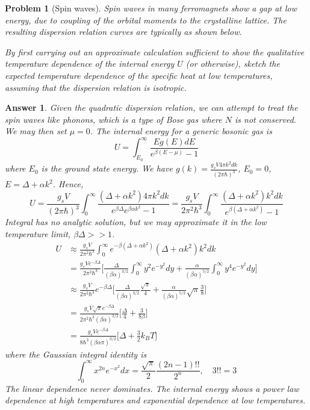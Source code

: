 \documentclass[a4paper]{article}
\theoremstyle{new2}
\newtheorem{ans}{Answer}[section]
\theoremstyle{new}
\newtheorem{qns}{Problem}[section]
\begin{document}
\begin{qns}[Spin waves]
Spin waves in many ferromagnets show a gap at low energy, due to coupling of the orbital moments to the crystalline lattice. The resulting dispersion relation curves are typically as shown below.
\begin{center}
\end{center}
By first carrying out an approximate calculation sufficient to show the qualitative temperature dependence of the internal energy $U$ (or otherwise), sketch the expected temperature dependence of the specific heat at low temperatures, assuming that the dispersion relation is isotropic.
\end{qns}
\begin{ans}
Given the quadratic dispersion relation, we can attempt to treat the spin waves like phonons, which is a type of Bose gas where $N$ is not conserved. We may then set $\mu=0$. The internal energy for a generic bosonic gas is
$$U=\int_{E_0}^\infty\frac{Eg(E)dE}{e^{\beta(E-\mu)}-1}$$
where $E_0$ is the ground state energy. We have $g(k)=\frac{g_sV4\pi k^2dk}{(2\pi\hbar)^3}$, $E_0=0$, $E=\Delta+\alpha k^2$. Hence,
$$U=\frac{g_sV}{(2\pi\hbar)^3}\int_0^\infty\frac{(\Delta+\alpha k^2)4\pi k^2dk}{e^{\beta\Delta}e^{\beta\alpha k^2}-1}=\frac{g_sV}{2\pi^2\hbar^3}\int_0^\infty\frac{(\Delta+\alpha k^2)k^2dk}{e^{\beta(\Delta+\alpha k^2)}-1}$$
Integral has no analytic solution, but we may approximate it in the low temperature limit, $\beta\Delta >>1$. 
\begin{align}
    U&\approx\frac{g_sV}{2\pi^2\hbar^3}\int_0^\infty e^{-\beta(\Delta+\alpha k^2)}(\Delta+\alpha k^2)k^2dk\nonumber\\&=\frac{g_sVe^{-\beta\Delta}}{2\pi^2\hbar^3}\bigg[\frac{\Delta}{(\beta\alpha)^{3/2}}\int_0^\infty y^2e^{-y^2}dy+\frac{\alpha}{(\beta\alpha)^{5/2}}\int_0^\infty y^4e^{-y^2}dy\bigg]\nonumber\\&\approx\frac{g_sV}{2\pi^2\hbar^3}e^{-\beta\Delta}\bigg[\frac{\Delta}{(\beta\alpha)^{3/2}}\frac{\sqrt{\pi}}{4}+\frac{\alpha}{(\beta\alpha)^{5/2}}\sqrt{\pi}\frac{3}{8}\bigg]\nonumber\\&=\frac{g_sV\sqrt{\pi}e^{-\beta\Delta}}{2\pi^2\hbar^3(\beta\alpha)^{3/2}}\bigg[\frac{\Delta}{4}+\frac{3}{8\beta}\bigg]\nonumber\\&=\frac{g_sVe^{-\beta\Delta}}{8\hbar^3(\beta\alpha\pi)^{3/2}}\bigg[\Delta+\frac{3}{2}k_BT\bigg]\nonumber
\end{align}
where the Gaussian integral identity is
$$\int_0^\infty x^{2n}e^{-x^2}dx=\frac{\sqrt{\pi}}{2}\frac{(2n-1)!!}{2^n},\quad 3!!=3$$
The linear dependence never dominates. The internal energy shows a power law dependence at high temperatures and exponential dependence at low temperatures.
\end{ans}
\end{document}
